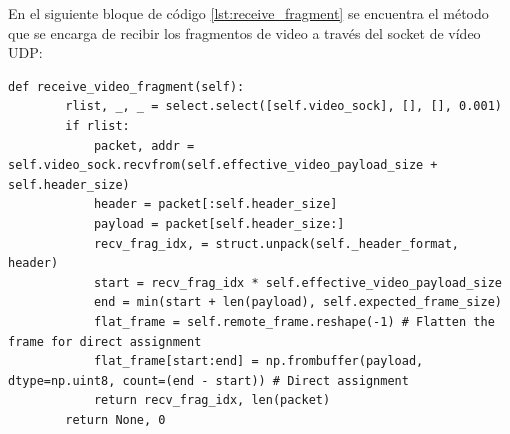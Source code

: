 En el siguiente bloque de código \ref{lst:receive_fragment} se encuentra el método que se encarga de recibir los fragmentos de video a través del socket de vídeo UDP:
\begin{lstlisting}[style=pythonstyle, caption={Método receive\_video\_fragment() de \textit{Minimal\_Video}}, label={lst:receive_fragment}]
def receive_video_fragment(self):
        rlist, _, _ = select.select([self.video_sock], [], [], 0.001)
        if rlist:
            packet, addr = self.video_sock.recvfrom(self.effective_video_payload_size + self.header_size)
            header = packet[:self.header_size]
            payload = packet[self.header_size:]
            recv_frag_idx, = struct.unpack(self._header_format, header)
            start = recv_frag_idx * self.effective_video_payload_size
            end = min(start + len(payload), self.expected_frame_size)
            flat_frame = self.remote_frame.reshape(-1) # Flatten the frame for direct assignment
            flat_frame[start:end] = np.frombuffer(payload, dtype=np.uint8, count=(end - start)) # Direct assignment
            return recv_frag_idx, len(packet)
        return None, 0
\end{lstlisting}

